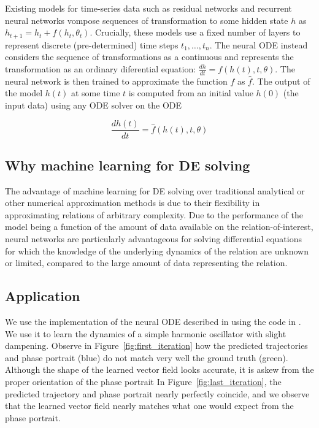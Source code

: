 \documentclass[11pt]{article}
\begin{document}
Existing models for time-series data such as residual networks and recurrent neural networks vompose sequences of transformation to some hidden state $h$ as $h_{t + 1} = h_t + f(h_t, \theta_t)$. Crucially, these models use a fixed number of layers to represent discrete (pre-determined) time steps $t_1, \dots, t_n$. The neural ODE instead considers the sequence of transformations as a continuous and represents the transformation as an ordinary diferential equation: $\frac{dh}{dt} = f(h(t), t, \theta)$. The neural network is then trained to approximate the function $f$ as $\hat f$. The output of the model $h(t)$ at some time $t$ is computed from an initial value $h(0)$ (the input data) using any ODE solver on the ODE

$$
\frac{dh(t)}{dt} = \hat f(h(t), t, \theta)
$$

\subsection{Why machine learning for DE solving}

The advantage of machine learning for DE solving over traditional analytical or other numerical approximation methods is due to their flexibility in approximating relations of arbitrary complexity. Due to the performance of the model being a function of the amount of data available on the relation-of-interest, neural networks are particularly advantageous for solving differential equations for which the knowledge of the underlying dynamics of the relation are unknown or limited, compared to the large amount of data representing the relation.

\subsection{Application}

We use the implementation of the neural ODE described in \cite{chen2018neuralode} using the code in \cite{torchdiffeq}. We use it to learn the dynamics of a simple harmonic oscillator with slight dampening. Observe in Figure~\ref{fig:first_iteration} how the predicted trajectories and phase portrait (blue) do not match very well the ground truth (green). Although the shape of the learned vector field looks accurate, it is askew from the proper orientation of the phase portrait In Figure~\ref{fig:last_iteration}, the predicted trajectory and phase portrait nearly perfectly coincide, and we observe that the learned vector field nearly matches what one would expect from the phase portrait.
\end{document}
